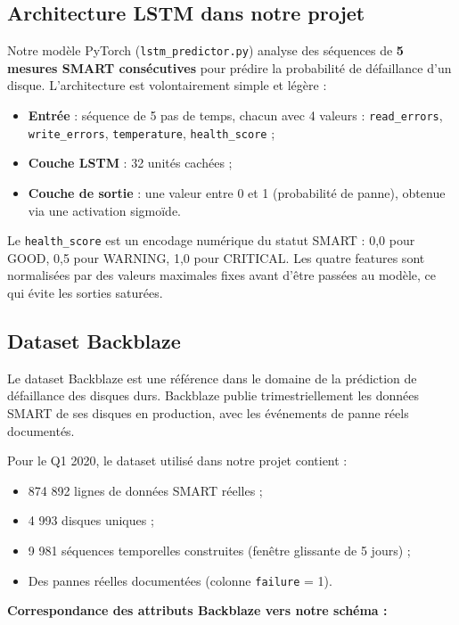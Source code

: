 \subsection{Architecture LSTM dans notre projet}

Notre modèle PyTorch (\texttt{lstm\_predictor.py}) analyse des séquences de
\textbf{5 mesures SMART consécutives} pour prédire la probabilité de défaillance
d'un disque. L'architecture est volontairement simple et légère :

\begin{itemize}
  \item \textbf{Entrée} : séquence de 5 pas de temps, chacun avec 4 valeurs :
        \texttt{read\_errors}, \texttt{write\_errors}, \texttt{temperature},
        \texttt{health\_score} ;
  \item \textbf{Couche LSTM} : 32 unités cachées ;
  \item \textbf{Couche de sortie} : une valeur entre 0 et 1 (probabilité de panne),
        obtenue via une activation sigmoïde.
\end{itemize}

Le \texttt{health\_score} est un encodage numérique du statut SMART :
0,0 pour GOOD, 0,5 pour WARNING, 1,0 pour CRITICAL. Les quatre features sont
normalisées par des valeurs maximales fixes avant d'être passées au modèle, ce
qui évite les sorties saturées.

\subsection{Dataset Backblaze}

Le dataset Backblaze est une référence dans le domaine de la prédiction de
défaillance des disques durs. Backblaze publie trimestriellement les données SMART
de ses disques en production, avec les événements de panne réels documentés.

Pour le Q1 2020, le dataset utilisé dans notre projet contient :
\begin{itemize}
  \item 874 892 lignes de données SMART réelles ;
  \item 4 993 disques uniques ;
  \item 9 981 séquences temporelles construites (fenêtre glissante de 5 jours) ;
  \item Des pannes réelles documentées (colonne \texttt{failure} = 1).
\end{itemize}

\textbf{Correspondance des attributs Backblaze vers notre schéma :}

